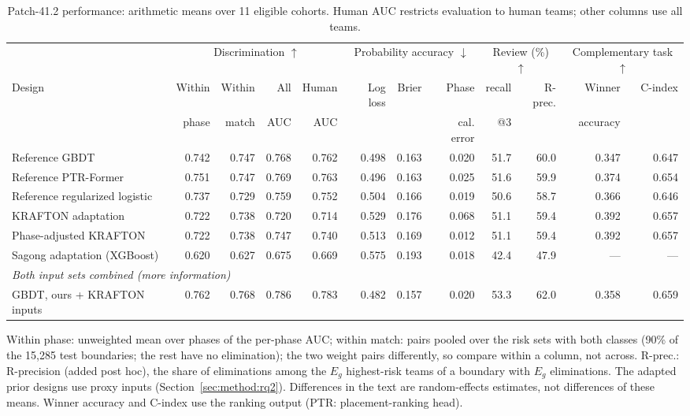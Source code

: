\begin{table}[t]
\centering\footnotesize
\caption{Patch-41.2 performance: arithmetic means over 11 eligible cohorts. Human AUC restricts evaluation to human teams; other columns use all teams.}
\label{tab:main}
\setlength{\tabcolsep}{2.5pt}
\begin{tabular*}{\textwidth}{@{\extracolsep{\fill}}lrrrrrrrrrrr@{}}
\toprule
 & \multicolumn{4}{c}{Discrimination $\uparrow$} & \multicolumn{3}{c}{Probability accuracy $\downarrow$} & \multicolumn{2}{c}{Review (\%) $\uparrow$} & \multicolumn{2}{c}{Complementary task $\uparrow$} \\
\cmidrule(lr){2-5}\cmidrule(lr){6-8}\cmidrule(lr){9-10}\cmidrule(lr){11-12}
Design & Within & Within & All & Human & Log loss & Brier & Phase & recall & R-prec. & Winner & C-index \\
 & phase & match & AUC & AUC &  &  & cal. error & @3 &  & accuracy &  \\
\midrule
Reference GBDT & 0.742 & 0.747 & 0.768 & 0.762 & 0.498 & 0.163 & 0.020 & 51.7 & 60.0 & 0.347 & 0.647 \\
Reference PTR-Former & 0.751 & 0.747 & 0.769 & 0.763 & 0.496 & 0.163 & 0.025 & 51.6 & 59.9 & 0.374 & 0.654 \\
Reference regularized logistic & 0.737 & 0.729 & 0.759 & 0.752 & 0.504 & 0.166 & 0.019 & 50.6 & 58.7 & 0.366 & 0.646 \\
KRAFTON adaptation & 0.722 & 0.738 & 0.720 & 0.714 & 0.529 & 0.176 & 0.068 & 51.1 & 59.4 & 0.392 & 0.657 \\
Phase-adjusted KRAFTON & 0.722 & 0.738 & 0.747 & 0.740 & 0.513 & 0.169 & 0.012 & 51.1 & 59.4 & 0.392 & 0.657 \\
Sagong adaptation (XGBoost) & 0.620 & 0.627 & 0.675 & 0.669 & 0.575 & 0.193 & 0.018 & 42.4 & 47.9 & --- & --- \\
\midrule
\multicolumn{12}{l}{\emph{Both input sets combined (more information)}} \\
GBDT, ours + KRAFTON inputs & 0.762 & 0.768 & 0.786 & 0.783 & 0.482 & 0.157 & 0.020 & 53.3 & 62.0 & 0.358 & 0.659 \\
\bottomrule
\end{tabular*}
\smallskip
\parbox{\textwidth}{\scriptsize Within phase: unweighted mean over phases of the per-phase AUC; within match: pairs pooled over the risk sets with both classes (90\% of the 15,285 test boundaries; the rest have no elimination); the two weight pairs differently, so compare within a column, not across. R-prec.: R-precision (added post hoc), the share of eliminations among the $E_g$ highest-risk teams of a boundary with $E_g$ eliminations. The adapted prior designs use proxy inputs (Section~\ref{sec:method:rq2}). Differences in the text are random-effects estimates, not differences of these means. Winner accuracy and C-index use the ranking output (PTR: placement-ranking head).}
\end{table}
